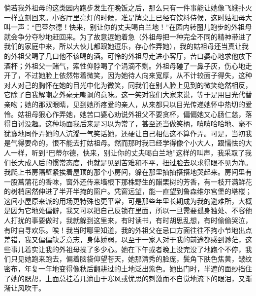 \par 倘若我外祖母的这类园内跑步发生在晚饭之后，那么只有一件事能让她像飞蛾扑火一样立刻回来。小客厅里亮灯的时候，准是牌桌上已经有饮料侍候，这时姑祖母大叫一声：“巴蒂尔德！快来，别让你的丈夫喝白兰地！”在园内转圈儿跑步的外祖母就会争分夺秒地赶回来。为了故意逗她着急（外祖母把一种完全不同的精神带进了我们的家庭中来，所以大伙儿都跟她逗乐，存心作弄她），我的姑祖母还当真让我的外祖父喝了几口他不该喝的酒。可怜的外祖母走进小客厅，苦口婆心地求他放下酒杯；外祖父一赌气，索性仰脖喝了个涓滴不剩。外祖母碰了一鼻子灰，伤心地走开了，不过她脸上依然带着微笑，因为她待人向来宽厚，从不计较面子得失，这种对人对己的胸怀在她的目光中化为微笑，同我们在别人脸上见到的微笑绝然相反，它除了自我解嘲之外毫无嘲讽的意味。这一笑对我们大家来说，等于是用目光代替亲吻；她的那双眼睛，见到她所疼爱的亲人，从来都只以目光传递她怀中热切的爱怜。姑祖母狠心作弄她，她苦口婆心劝说外祖父不要贪杯，偏偏她又心肠仁慈，落得自讨没趣。这种场面我后来是习以为常了，甚至还当做笑柄，嘻嘻哈哈地、毫不犹豫地同作弄她的人沆瀣一气笑话她，还硬让自己相信这不算作弄。可是，当初我是气得要命的，恨不能去打姑祖母。然而那时我已经学得像个小大人，跟懦怯的大人一样，听到“巴蒂尔德，快来，别让你的丈夫喝白兰地”这样的叫声，我采取了我们长大成人后的惯常态度，也就是见到苦难和不平，扭过脸去以求得眼不见为净。我爬上书房隔壁紧挨着屋顶的那个小房间，躲在那里抽抽搭搭地哭起来。房间里有一股菖蒲花的香味，窗外还传来墙根下那株野生的醋栗树的芳香，有一枝开满鲜花的树梢居然伸进了半开半掩的窗户。凭窗远望，能一直望到鲁森维尔宫堡的塔楼；这间小屋原来派的用场更特殊也更平常，可是那些年里长期成为我的避难所，大概是因为它地处偏僻，我又可以把自己反锁在里面，所以一旦需要孤身独处、不容他人打扰的事要做时，我就躲到这里来，有时读书，有时胡思乱想，有时偷偷哭泣，有时自寻欢乐。唉！我当时哪里知道，我的外祖父在忌口方面往往不拘小节地出点差错，我又偏偏缺乏意志，身体娇弱，以至于一家人对于我的前途都感到渺茫，这些事儿着实让我的外祖母操了多少心。她在下午或者晚上没完没了地跑个不停，我们只见她跑来跑去，偏着脑袋仰望苍天，她那清秀的脸庞，鬓角下肤色焦黄，皱纹密布，年复一年地变得像秋后翻耕过的土地泛出紫色。她出门时，半遮的面纱挡住了她的腮帮，上面总挂着几滴由于寒风或忧思的刺激而不自觉地流下的眼泪，又渐渐让风吹干。

